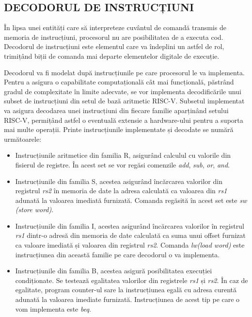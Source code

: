 \documentclass[12pt]{article}
\begin{document}
\subsection{DECODORUL DE INSTRUCȚIUNI}
 În lipsa unei entități care să interpreteze cuvântul de comandă transmis de memoria de instrucțiuni, procesorul nu are posibilitatea de a executa cod. Decodorul de instrucțiuni este elementul care va îndeplini un astfel de rol, trimițând biții de comanda mai departe elementelor digitale de execuție.
 
 Decodorul va fi modelat după instrucțiunile pe care procesorul le va implementa. Pentru a asigura o capabilitate computațională cât mai funcțională, păstrând gradul de complexitate în limite adecvate, se vor implementa decodificările unui subset de instrucțiuni din setul de bază aritmetic RISC-V. Subsetul implementat va asigura decodarea unei instrucțiuni din fiecare familie aparținând setului RISC-V, permițând astfel o eventuală extensie a hardware-ului pentru a suporta mai multe operații. Printe instrucțiunile implementate și decodate se numără următoarele:
 
 \begin{itemize}
\item Instrucțiunile aritmetice din familia R, asigurând calculul cu valorile din fisierul de registre. În acest set se vor regăsi comenzile \textit{add}, \textit{sub}, \textit{or}, \textit{and}.
\item Instrucțiunile din familia S, acestea asigurând încărcarea valorilor din registrul  \textit{rs2} în memoria de date la adresa calculată ca valoarea din  \textit{rs1} adunată la valoarea imediată furnizată. Comanda regăsită în acest set este \textit{sw (store word)}.
\item Instrucțiunile din familia I, acestea asigurând încărcarea valorilor în registrul \textit{rs1} dintr-o adresă din memoria de date calculată ca suma unui offset furnizat ca valoare imediată și valoarea din registrul \textit{rs2}. Comanda \textit{lw(load word)} este instrucțiunea din această familie pe care decodorul o va implementa.
\item Instrucțiunile din familia B, acestea asigură posibilitatea execuției condiționate. Se testează egalitatea valorilor din registrele  \textit{rs1} și  \textit{rs2}. În caz de egalitate, program counter-ul sare la instrucțiunea egală cu adresa curentă adunată la valoarea imediate furnizată. Instrucțiunea de acest tip pe care o vom implementa este  \textit{beq}.
\end{itemize}
\end{document}
